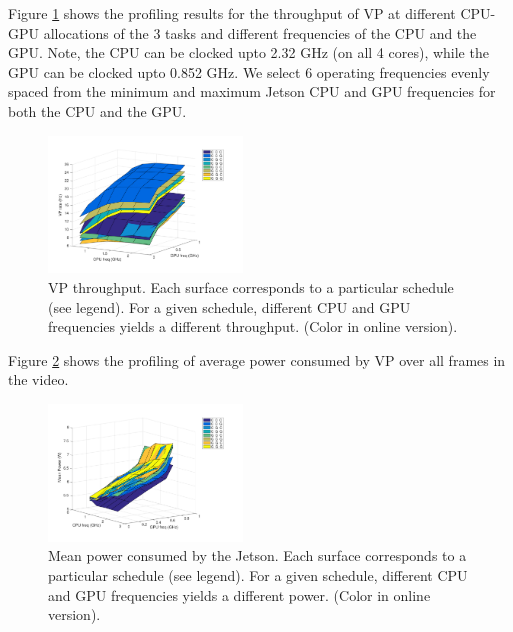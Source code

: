 Figure \ref{fig:sfda} shows the profiling results for the throughput of 
VP at different CPU-GPU allocations of the 3 tasks and different frequencies of the CPU and the GPU. 
Note, the CPU can be clocked upto 2.32 GHz (on all 4 cores), while the GPU can be clocked upto 0.852 GHz. 
We select 6 operating frequencies evenly spaced from the minimum and maximum Jetson CPU and GPU frequencies for both the CPU and the GPU. 
\begin{figure}[htbp]
	\centering
	\includegraphics[width=0.46\textwidth]{Figs/surf_Rate.pdf}
	\caption{VP throughput. Each surface corresponds to a particular schedule (see legend). For a given schedule, different CPU and GPU frequencies yields a different throughput. (Color in online version).}
	\label{fig:sfda}%
\end{figure}


Figure \ref{fig:sfda_pow} shows the profiling of average power consumed by VP over all frames in the video.


\begin{figure}[htbp]
	\centering
	\includegraphics[width=0.46\textwidth]{Figs/surf_Power.pdf}
	\caption{Mean power consumed by the Jetson. Each surface corresponds to a particular schedule (see legend). For a given schedule, different CPU and GPU frequencies yields a different power. (Color in online version).}
	\label{fig:sfda_pow}%
\end{figure}

